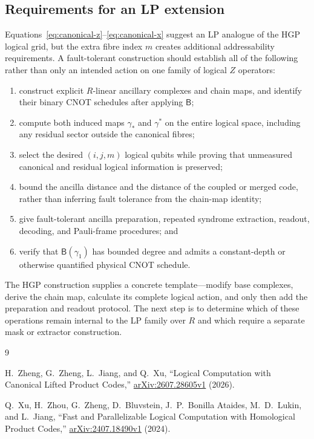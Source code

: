 \documentclass[11pt]{article}
\newcommand{\B}{\mathsf{B}}
\begin{document}
\subsection{Requirements for an LP extension}

Equations~\eqref{eq:canonical-z}--\eqref{eq:canonical-x} suggest an LP analogue
of the HGP logical grid, but the extra fibre index $m$ creates additional
addressability requirements. A fault-tolerant construction should establish
all of the following rather than only an intended action on one family of
logical $Z$ operators:
\begin{enumerate}
  \item construct explicit $R$-linear ancillary complexes and chain maps, and
        identify their binary CNOT schedules after applying $\B$;
  \item compute both induced maps $\gamma_*$ and $\gamma^*$ on the entire
        logical space, including any residual sector outside the canonical
        fibres;
  \item select the desired $(i,j,m)$ logical qubits while proving that
        unmeasured canonical and residual logical information is preserved;
  \item bound the ancilla distance and the distance of the coupled or merged
        code, rather than inferring fault tolerance from the chain-map identity;
  \item give fault-tolerant ancilla preparation, repeated syndrome extraction,
        readout, decoding, and Pauli-frame procedures; and
  \item verify that $\B(\gamma_1)$ has bounded degree and admits a constant-depth
        or otherwise quantified physical CNOT schedule.
\end{enumerate}
The HGP construction supplies a concrete template---modify base complexes,
derive the chain map, calculate its complete logical action, and only then add
the preparation and readout protocol. The next step is to determine which of
these operations remain internal to the LP family over $R$ and which require a
separate mask or extractor construction.

\begin{thebibliography}{9}

H.~Zheng, G.~Zheng, L.~Jiang, and Q.~Xu,
``Logical Computation with Canonical Lifted Product Codes,''
\href{https://arxiv.org/abs/2607.28605v1}{arXiv:2607.28605v1} (2026).

Q.~Xu, H.~Zhou, G.~Zheng, D.~Bluvstein, J.~P.~Bonilla Ataides,
M.~D.~Lukin, and L.~Jiang,
``Fast and Parallelizable Logical Computation with Homological Product Codes,''
\href{https://arxiv.org/abs/2407.18490v1}{arXiv:2407.18490v1} (2024).

\end{thebibliography}
\end{document}
